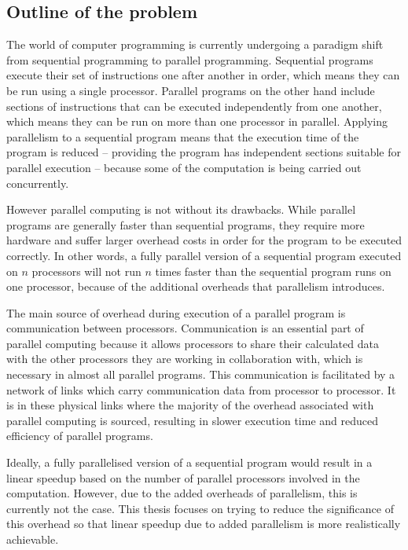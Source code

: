 \documentclass[a4paper, 12pt]{article}
\begin{document}
\subsection{Outline of the problem}
\label{sec:problem_outline}

The world of computer programming is currently undergoing a paradigm shift from sequential programming to parallel programming. Sequential programs execute their set of instructions one after another in order, which means they can be run using a single processor. Parallel programs on the other hand include sections of instructions that can be executed independently from one another, which means they can be run on more than one processor in parallel. Applying parallelism to a sequential program means that the execution time of the program is reduced -- providing the program has independent sections suitable for parallel execution -- because some of the computation is being carried out concurrently.

However parallel computing is not without its drawbacks. While parallel programs are generally faster than sequential programs, they require more hardware and suffer larger overhead costs in order for the program to be executed correctly. In other words, a fully parallel version of a sequential program executed on $n$ processors will not run $n$ times faster than the sequential program runs on one processor, because of the additional overheads that parallelism introduces.

The main source of overhead during execution of a parallel program is communication between processors. Communication is an essential part of parallel computing because it allows processors to share their calculated data with the other processors they are working in collaboration with, which is necessary in almost all parallel programs. This communication is facilitated by a network of links which carry communication data from processor to processor. It is in these physical links where the majority of the overhead associated with parallel computing is sourced, resulting in slower execution time and reduced efficiency of parallel programs.

Ideally, a fully parallelised version of a sequential program would result in a linear speedup based on the number of parallel processors involved in the computation. However, due to the added overheads of parallelism, this is currently not the case. This thesis focuses on trying to reduce the significance of this overhead so that linear speedup due to added parallelism is more realistically achievable.
\end{document}
